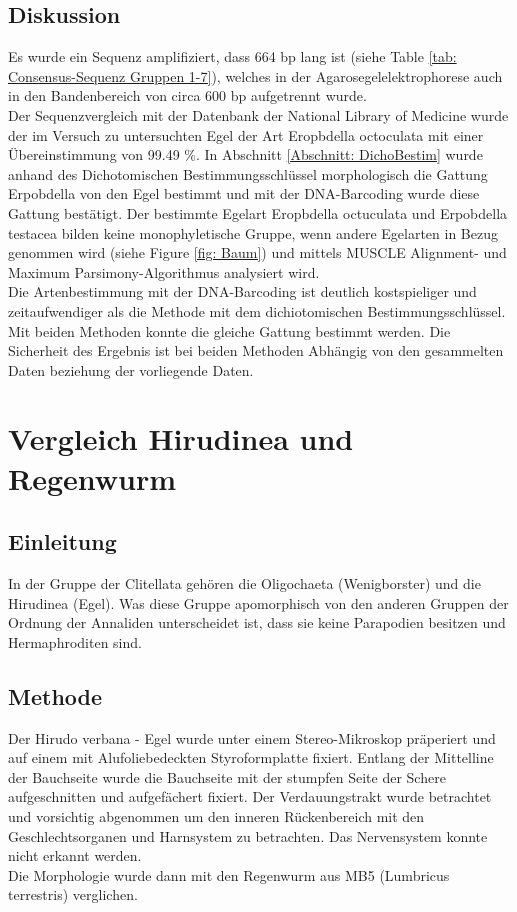 \documentclass[oneside,10pt,a4paper]{report}
\begin{document}
			\subsection{Diskussion}
				Es wurde ein Sequenz amplifiziert, dass 664 bp lang ist (siehe Table \ref{tab: Consensus-Sequenz Gruppen 1-7}), welches in der Agarosegelelektrophorese auch in den Bandenbereich von circa 600 bp aufgetrennt wurde.\\
				Der Sequenzvergleich mit der Datenbank der National Library of Medicine wurde der im Versuch zu untersuchten Egel der Art Eropbdella octoculata mit einer Übereinstimmung von 99.49 $\%$.  
				In Abschnitt \ref{Abschnitt: DichoBestim} wurde anhand des Dichotomischen Bestimmungsschlüssel morphologisch die Gattung Erpobdella von den Egel bestimmt und mit der DNA-Barcoding wurde diese Gattung bestätigt.
				Der bestimmte Egelart Eropbdella octuculata und Erpobdella testacea bilden keine monophyletische Gruppe, wenn andere Egelarten in Bezug genommen wird (siehe Figure \ref{fig: Baum}) und mittels MUSCLE Alignment- und Maximum Parsimony-Algorithmus analysiert wird.\\
				Die Artenbestimmung mit der DNA-Barcoding ist deutlich kostspieliger und zeitaufwendiger als die Methode mit dem dichiotomischen Bestimmungsschlüssel. Mit beiden Methoden konnte die gleiche Gattung bestimmt werden.
				Die Sicherheit des Ergebnis ist bei beiden Methoden Abhängig von den gesammelten Daten beziehung der vorliegende Daten.\\
				
		\section{Vergleich Hirudinea und Regenwurm}
			\subsection{Einleitung}
				In der Gruppe der Clitellata gehören die Oligochaeta (Wenigborster) und die Hirudinea (Egel).
				Was diese Gruppe apomorphisch von den anderen Gruppen der Ordnung der Annaliden unterscheidet ist, dass sie keine Parapodien besitzen und Hermaphroditen sind.\\
				
			\subsection{Methode}
				Der Hirudo verbana - Egel wurde unter einem Stereo-Mikroskop präperiert und auf einem mit Alufoliebedeckten Styroformplatte fixiert. Entlang der Mittelline der Bauchseite wurde die Bauchseite mit der stumpfen Seite der Schere aufgeschnitten und aufgefächert fixiert. Der Verdauungstrakt wurde betrachtet und vorsichtig abgenommen um den inneren Rückenbereich mit den Geschlechtsorganen und Harnsystem zu betrachten. Das Nervensystem konnte nicht erkannt werden.\\
				Die Morphologie wurde dann mit den Regenwurm aus MB5 (Lumbricus terrestris) verglichen.
\end{document}

